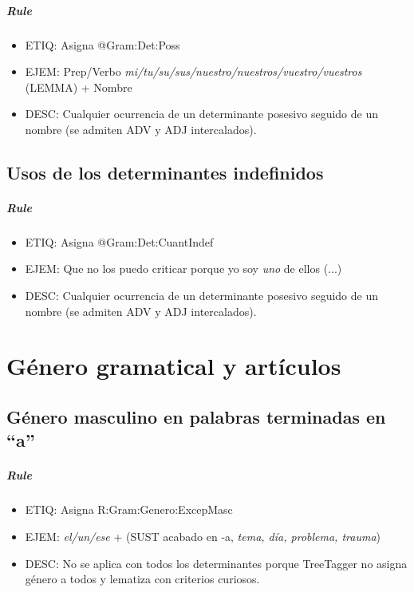 \documentclass[11pt]{report}
\begin{document}
\paragraph*{Rule}
\begin{itemize}
\item ETIQ: Asigna @Gram:Det:Poss
\item EJEM: Prep/Verbo \emph{mi/tu/su/sus/nuestro/nuestros/vuestro/vuestros} (LEMMA) + Nombre
\item DESC: Cualquier ocurrencia de un determinante posesivo seguido de un nombre (se admiten ADV y ADJ intercalados).
\end{itemize}

\section{Usos de los determinantes indefinidos}
\paragraph*{Rule}
\begin{itemize}
\item ETIQ: Asigna @Gram:Det:CuantIndef
\item EJEM: Que no los puedo criticar porque yo soy \emph{uno} de ellos (...)
\item DESC: Cualquier ocurrencia de un determinante posesivo seguido de un nombre (se admiten ADV y ADJ intercalados).
\end{itemize}

\chapter{Género gramatical y artículos}
\section{Género masculino en palabras terminadas en ``a''}
\paragraph*{Rule}
\begin{itemize}
\item ETIQ: Asigna R:Gram:Genero:ExcepMasc
\item EJEM: \emph{el/un/ese} + (SUST acabado en -a, \emph{tema, día, problema, trauma})
\item DESC: No se aplica con todos los determinantes porque TreeTagger no asigna género a todos y lematiza con criterios curiosos.
\end{itemize}
\end{document}
